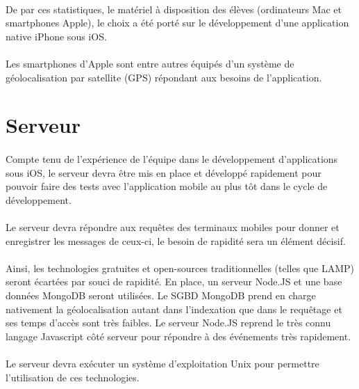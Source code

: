 \documentclass[a4paper,12pt]{report}
\begin{document}
\begin{onehalfspace}
	\paragraph*{}
	De par ces statistiques, le matériel à disposition des élèves (ordinateurs Mac et smartphones Apple), le choix a été porté sur le développement d'une application native iPhone sous iOS.
	
	\paragraph*{}
	Les smartphones d'Apple sont entre autres équipés d'un système de géolocalisation par satellite (GPS) répondant aux besoins de l'application.

	\section*{Serveur}
	
	\paragraph*{}
	Compte tenu de l'expérience de l'équipe dans le développement d'applications sous iOS, le serveur devra être mis en place et développé rapidement pour pouvoir faire des tests avec l'application mobile au plus tôt dans le cycle de développement.

	\paragraph*{}
	Le serveur devra répondre aux requêtes des terminaux mobiles pour donner et enregistrer les messages de ceux-ci, le besoin de rapidité sera un élément décisif.
	
	\paragraph*{}
	Ainsi, les technologies gratuites et open-sources traditionnelles (telles que LAMP) seront écartées par souci de rapidité. En place, un serveur Node.JS et une base données MongoDB seront utilisées.
	Le SGBD MongoDB prend en charge nativement la géolocalisation autant dans l’indexation que dans le requêtage et ses temps d'accès sont très faibles.
	Le serveur Node.JS reprend le très connu langage Javascript côté serveur pour répondre à des événements très rapidement.
	
	\paragraph*{}
	Le serveur devra exécuter un système d'exploitation Unix pour permettre l'utilisation de ces technologies.
	

\end{onehalfspace}
\end{document}
